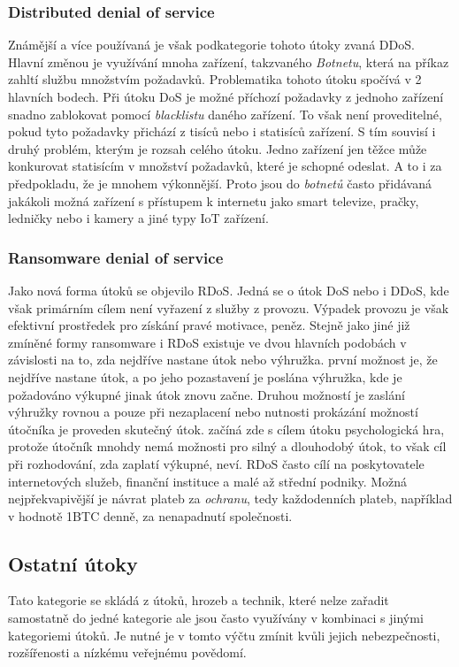 \subsubsection{Distributed denial of service}
Známější a více používaná je však podkategorie tohoto útoky zvaná \ac{DDoS}.
Hlavní změnou je využívání mnoha zařízení, takzvaného \textit{Botnetu}, která na příkaz zahltí službu množstvím požadavků.
Problematika tohoto útoku spočívá v 2 hlavních bodech.
Při útoku \ac{DoS} je možné příchozí požadavky z jednoho zařízení snadno zablokovat pomocí \textit{blacklistu} daného zařízení.
To však není proveditelné, pokud tyto požadavky přichází z tisíců nebo i statisíců zařízení.
S tím souvisí i druhý problém, kterým je rozsah celého útoku.
Jedno zařízení jen těžce může konkurovat statisícím v množství požadavků, které je schopné odeslat.
A to i za předpokladu, že je mnohem výkonnější.
Proto jsou do \textit{botnetů} často přidávaná jakákoli možná zařízení s přístupem k internetu jako smart televize, pračky, ledničky nebo i kamery a jiné typy \ac{IoT} zařízení.\cite{cisco_most_common_attack}



\subsubsection{Ransomware denial of service}
Jako nová forma útoků se objevilo \ac{RDoS}.
Jedná se o útok \ac{DoS} nebo i \ac{DDoS}, kde však primárním cílem není vyřazení z služby z provozu.
Výpadek provozu je však efektivní prostředek pro získání pravé motivace, peněz.
Stejně jako jiné již zmíněné formy ransomware i \ac{RDoS} existuje ve dvou hlavních podobách v závislosti na to, zda nejdříve nastane útok nebo výhružka.
první možnost je, že nejdříve nastane útok, a po jeho pozastavení je poslána výhružka, kde je požadováno výkupné jinak útok znovu začne.
Druhou možností je zaslání výhružky rovnou a pouze při nezaplacení nebo nutnosti prokázání možností útočníka je proveden skutečný útok.
začíná zde s cílem útoku psychologická hra, protože útočník mnohdy nemá možnosti pro silný a dlouhodobý útok, to však cíl při rozhodování, zda zaplatí výkupné, neví.
\ac{RDoS} často cílí na poskytovatele internetových služeb, finanční instituce a malé až střední podniky.
Možná nejpřekvapivější je návrat plateb za \textit{ochranu}, tedy každodenních plateb, například v hodnotě 1BTC denně, za nenapadnutí společnosti.\cite{Enisa_thread_landscape}


\subsection{Ostatní útoky}\label{subsec:ostatni-utoky}
Tato kategorie se skládá z útoků, hrozeb a technik, které nelze zařadit samostatně do jedné kategorie ale jsou často využívány v kombinaci s jinými kategoriemi útoků.
Je nutné je v tomto výčtu zmínit kvůli jejich nebezpečnosti, rozšířenosti a nízkému veřejnému povědomí.

